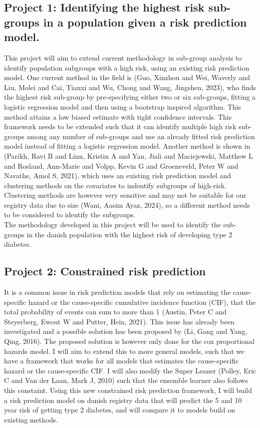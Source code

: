 \documentclass[11pt]{article}
\begin{document}
\subsection{Project 1: Identifying the highest risk sub-groups in a population given a risk prediction model.}
\label{sec:orgee8b0de}
This project will aim to extend current methodology in sub-group analysis to identify population subgroups with a high risk, using an existing risk prediction model. One current method in the field is  (Guo, Xinzhou and Wei, Waverly and Liu, Molei and Cai, Tianxi and Wu, Chong and Wang, Jingshen, 2023), who finds the highest risk sub-group by pre-specifying either two or six sub-groups, fitting a logistic regression model and then using a bootstrap inspired algorithm. This method attains a low biased estimate with tight confidence intervals. This framework needs to be extended such that it can identify multiple high risk sub-groups among any number of sub-groups and use an already fitted risk prediction model instead of fitting a logistic regression model. Another method is shown in (Parikh, Ravi B and Linn, Kristin A and Yan, Jiali and Maciejewski, Matthew L and Rosland, Ann-Marie and Volpp, Kevin G and Groeneveld, Peter W and Navathe, Amol S, 2021), which uses an existing risk prediction model and clustering methods on the covariates to indentify subgroups of high-risk. Clustering methods are however very sensitive and may not be suitable for our registry data due to size (Wani, Aasim Ayaz, 2024), so a different method needs to be considered to identify the subgroups.\\[0pt]
The methodology developed in this project will be used to identify the sub-groups in the danish population with the highest risk of developing type 2 diabetes.

\subsection{Project 2: Constrained risk prediction}
\label{sec:orgd1fb35f}
It is a common issue in risk prediction models that rely on estimating the cause-specific hazard or
the cause-specific cumulative incidence function (CIF), that the total probability of events can sum
to more than 1 (Austin, Peter C and Steyerberg, Ewout W and Putter, Hein, 2021). This issue has already been investigated and a possible solution has been
proposed by (Li, Gang and Yang, Qing, 2016). The proposed solution is however only done for the cox proportional hazards
model. I will aim to extend this to more general models, such that we have a framework that works for all models that estimates the cause-specific hazard or the cause-specific CIF. I will also modify the Super Leaner (Polley, Eric C and Van der Laan, Mark J, 2010) such that the ensemble learner also follows this constaint.
Using this new constrained risk prediction framework, I will build a risk prediction model on danish registry data that will predict the 5 and 10 year risk of getting type 2 diabetes, and will compare it to models build on existing methods.
\end{document}
